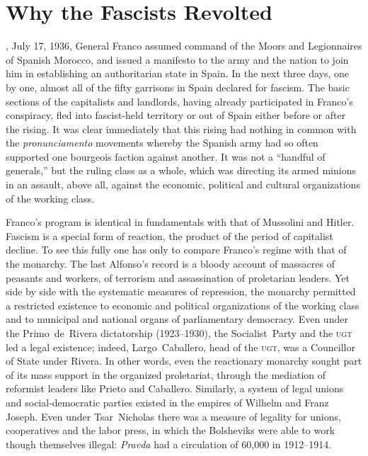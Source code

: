\chapter{Why the Fascists Revolted}

, July 17, 1936, General Franco{\indexFFranco} assumed command of the Moors and Legionnaires of Spanish Morocco, and issued a manifesto to the army and the nation to join him in establishing an authoritarian state in Spain. In the next three days, one by one, almost all of the fifty garrisons in Spain declared for fascism. The basic sections of the capitalists and landlords, having already participated in Franco’s conspiracy, fled into fascist-held territory or out of Spain either before or after the rising. It was clear immediately that this rising had nothing in common with the \emph{pronunciamento} movements whereby the Spanish army had so often supported one bourgeois faction against another. It was not a ``handful of generals,'' but the ruling class as a whole, which was directing its armed minions in an assault, above all, against the economic, political and cultural organizations of the working class.

Franco’s program is identical in fundamentals with that of Mussolini and Hitler. Fascism is a special form of reaction, the product of the period of capitalist decline. To see this fully one has only to compare Franco’s regime with that of the monarchy. The last Alfonso’s record is a bloody account of massacres of peasants and workers, of terrorism and assassination of proletarian leaders. Yet side by side with the systematic measures of repression, the monarchy permitted a restricted existence to economic and political organizations of the working class and to municipal and national organs of parliamentary democracy. Even under the Primo~de~Rivera dictatorship (1923--1930), the Socialist~Party and the \textsc{ugt} led a legal existence; indeed, Largo~Caballero{\indexLCaballero}, head of the \textsc{ugt}, was a Councillor of State under Rivera. In other words, even the reactionary monarchy sought part of its mass support in the organized proletariat, through the mediation of reformist leaders like Prieto and Caballero. Similarly, a system of legal unions and social-democratic parties existed in the empires of Wilhelm and Franz Joseph. Even under Tsar~Nicholas there was a measure of legality for unions, cooperatives and the labor press, in which the Bolsheviks were able to work though themselves illegal: \emph{Pravda} had a circulation of 60,000 in 1912--1914.

